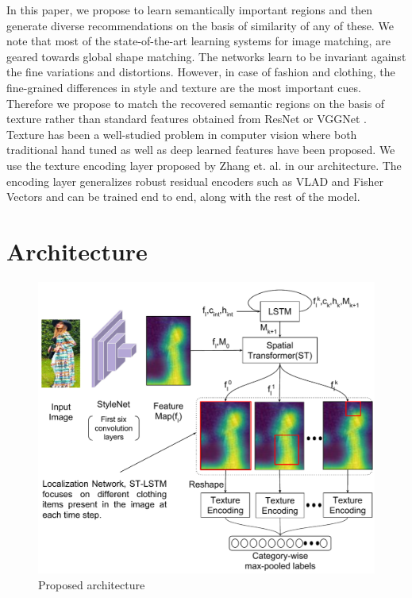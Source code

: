 \documentclass{article}
\begin{document}
In this paper, we propose to learn semantically important regions and then generate diverse recommendations on the basis of similarity of any of these. We note that most of the state-of-the-art learning systems for image matching, are geared towards global shape matching. The networks learn to be invariant against the fine variations and distortions. However, in case of fashion and clothing, the fine-grained differences in style and texture are the most important cues. Therefore we propose to match the recovered semantic regions on the basis of texture rather than standard features obtained from ResNet \cite{resnet50} or VGGNet \cite{vgg2014}. Texture has been a well-studied problem in computer vision where both traditional hand tuned \cite{LokeICCE2017, LiuMM2012} as well as deep learned features \cite{cimpoi2015deep, andrearczyk2016using} have been proposed. We use the texture encoding layer proposed by Zhang et. al. \cite{ZhangCVPR2017} in our architecture. The encoding layer generalizes robust residual encoders such as VLAD \cite{VLADCVPR2010} and Fisher Vectors \cite{FisherCVPR2007} and can be trained end to end, along with the rest of the model.

\section{Architecture}

\begin{figure}[t]
\centering
\includegraphics[width=1.0\linewidth]{staqu_st_ten_arch}
\caption{Proposed architecture}
\label{fig:res}
\end{figure}
\end{document}
